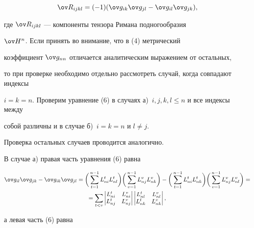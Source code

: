 \begin{pf}
\begin{equation}
\ov R_{ijkl}=(-1)(\ov g_{ik}\ov g_{jl}-\ov g_{il} \ov g_{jk}),


\end{equation}


где $\ov R_{ijkl}$ --- компоненты тензора Римана подногообразия 


$\ov H{}^n$. Если принять во внимание, что в (4) метрический 


коэффициент $\ov g_{nn}$ отличается аналитическим выражением от остальных, 


то при проверке необходимо отдельно рассмотреть случай, когда совпадают индексы 


$i=k=n$. Проверим уравнение (6) в случаях а)~$i,j,k,l\leq n$ и все индексы между


собой различны и в случае б)~$i=k=n$ и $l \neq j$. 


Проверка остальных случаев проводится аналогично.





В случае а) правая часть уравнения (6) равна


\begin{gather*}


\ov g_{il} \ov g_{jk}-\ov g_{ik} \ov g_{jl}=


\bigg(\sum^{n-1}_{t=1}L^t_{ni}L^t_{nl}\bigg)


\bigg(\sum^{n-1}_{v=1}L^v_{nj}L^v_{nk}\bigg)-


\bigg(\sum^{n-1}_{t=1}L^t_{ni}L^t_{nk}\bigg)


\bigg(\sum^{n-1}_{v=1}L^v_{nj}L^v_{nl}\bigg)=\\


%


=\sum_{t<v}


\begin{vmatrix}


L^t_{ni} & L^v_{ni} \\ L^t_{nj} & L^v_{nj} 


\end{vmatrix}


\begin{vmatrix} L^t_{nl} & L^v_{nl} \\


L^t_{nk} & L^v_{nk} \end{vmatrix},


\end{gather*}


а левая часть (6) равна


\begin{gather*}



\end{gather*}
\end{pf}
